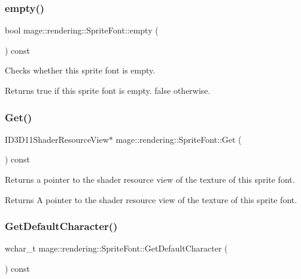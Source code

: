 \subsubsection{\texorpdfstring{empty()}{empty()}}
{\footnotesize\ttfamily bool mage\+::rendering\+::\+Sprite\+Font\+::empty (\begin{DoxyParamCaption}{ }\end{DoxyParamCaption}) const\hspace{0.3cm}{\ttfamily [noexcept]}}

Checks whether this sprite font is empty.

\begin{DoxyReturn}{Returns}
{\ttfamily true} if this sprite font is empty. {\ttfamily false} otherwise. 
\end{DoxyReturn}
\mbox{\label{classmage_1_1rendering_1_1_sprite_font_ab24067a24942427a39d88ca042da3484}} 
\subsubsection{\texorpdfstring{Get()}{Get()}}
{\footnotesize\ttfamily I\+D3\+D11\+Shader\+Resource\+View$\ast$ mage\+::rendering\+::\+Sprite\+Font\+::\+Get (\begin{DoxyParamCaption}{ }\end{DoxyParamCaption}) const\hspace{0.3cm}{\ttfamily [noexcept]}}

Returns a pointer to the shader resource view of the texture of this sprite font.

\begin{DoxyReturn}{Returns}
A pointer to the shader resource view of the texture of this sprite font. 
\end{DoxyReturn}
\mbox{\label{classmage_1_1rendering_1_1_sprite_font_af50e0ef59bf9d4be7b402c71609de497}} 
\subsubsection{\texorpdfstring{Get\+Default\+Character()}{GetDefaultCharacter()}}
{\footnotesize\ttfamily wchar\+\_\+t mage\+::rendering\+::\+Sprite\+Font\+::\+Get\+Default\+Character (\begin{DoxyParamCaption}{ }\end{DoxyParamCaption}) const\hspace{0.3cm}{\ttfamily [noexcept]}}

